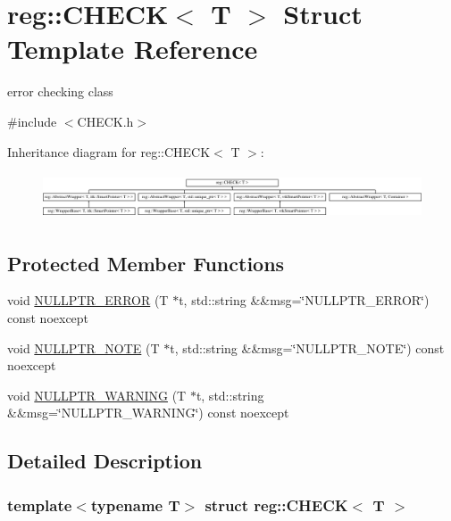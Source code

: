 \hypertarget{structreg_1_1_c_h_e_c_k}{}\section{reg\+:\+:C\+H\+E\+CK$<$ T $>$ Struct Template Reference}
\label{structreg_1_1_c_h_e_c_k}


error checking class  




{\ttfamily \#include $<$C\+H\+E\+C\+K.\+h$>$}

Inheritance diagram for reg\+:\+:C\+H\+E\+CK$<$ T $>$\+:\begin{figure}[H]
\begin{center}
\leavevmode
\includegraphics[height=1.390728cm]{structreg_1_1_c_h_e_c_k}
\end{center}
\end{figure}
\subsection*{Protected Member Functions}
\begin{DoxyCompactItemize}
\item 
void \hyperlink{structreg_1_1_c_h_e_c_k_a71d36138703b538aebcd1ca2dabd2d63}{N\+U\+L\+L\+P\+T\+R\+\_\+\+E\+R\+R\+OR} (T $\ast$t, std\+::string \&\&msg=\char`\"{}N\+U\+L\+L\+P\+T\+R\+\_\+\+E\+R\+R\+OR\char`\"{}) const noexcept
\item 
void \hyperlink{structreg_1_1_c_h_e_c_k_ab3559ddae75930312bb95e57dc07f655}{N\+U\+L\+L\+P\+T\+R\+\_\+\+N\+O\+TE} (T $\ast$t, std\+::string \&\&msg=\char`\"{}N\+U\+L\+L\+P\+T\+R\+\_\+\+N\+O\+TE\char`\"{}) const noexcept
\item 
void \hyperlink{structreg_1_1_c_h_e_c_k_aaa2449b02889f76964587061684795d2}{N\+U\+L\+L\+P\+T\+R\+\_\+\+W\+A\+R\+N\+I\+NG} (T $\ast$t, std\+::string \&\&msg=\char`\"{}N\+U\+L\+L\+P\+T\+R\+\_\+\+W\+A\+R\+N\+I\+NG\char`\"{}) const noexcept
\end{DoxyCompactItemize}


\subsection{Detailed Description}
\subsubsection*{template$<$typename T$>$\newline
struct reg\+::\+C\+H\+E\+C\+K$<$ T $>$}

